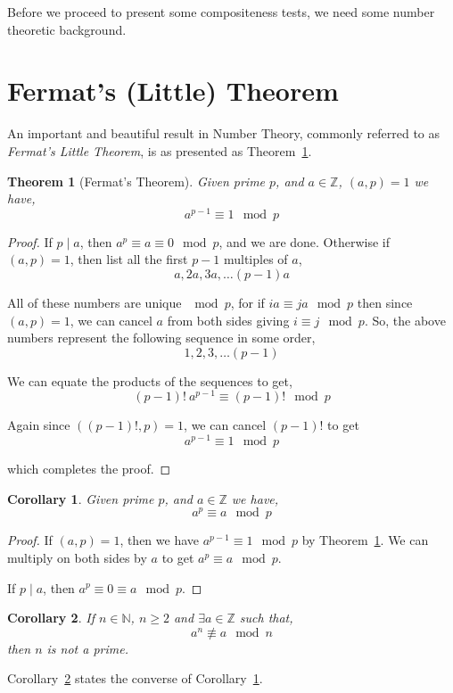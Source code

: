 \documentclass[11pt]{article}
\newtheorem{theorem}{Theorem}[section]
\newtheorem{corollary}{Corollary}[theorem]
\begin{document}
Before we proceed to present some compositeness tests, we need some number theoretic background.

\section{Fermat's (Little) Theorem}

An important and beautiful result in Number Theory, commonly referred to as \emph{Fermat's Little Theorem}, is as presented as Theorem~\ref{theorem:FermatLittleTheorem}.

\begin{theorem}[Fermat's Theorem]
\label{theorem:FermatLittleTheorem}
Given prime $p$, and $a \in \mathbb{Z}$, $(a,p) = 1$ we have,
\[ a^{p-1} \equiv 1 \mod p \]
\end{theorem}

\begin{proof}
If $p \mid a$, then $a^p \equiv a \equiv 0 \mod p$, and we are done. Otherwise if $(a,p) = 1$, then list all the first $p-1$ multiples of $a$,
\[ a, 2a, 3a, \dots (p-1)a\]

All of these numbers are unique $\mod p$, for if $ia \equiv ja \mod p$ then since $(a,p) = 1$, we can cancel $a$ from both sides giving $i \equiv j \mod p$. So, the above numbers represent the following sequence in some order,
\[ 1, 2, 3, \dots (p-1)\]

We can equate the products of the sequences to get, 
\[(p-1)!\ a^{p -1}\equiv (p-1)! \mod p\]

Again since $((p-1)!,p) = 1$, we can cancel $(p-1)!$ to get
\[a^{p-1} \equiv 1 \mod p\]

which completes the proof.
\end{proof}

\begin{corollary}
\label{corollary:BetterFermatLittleTheorem}
Given prime $p$, and $a \in \mathbb{Z}$ we have,
\[ a^p \equiv a \mod p \]
\end{corollary}
 
\begin{proof}
If $(a,p) = 1$, then we have $a^{p-1} \equiv 1 \mod p$ by Theorem~\ref{theorem:FermatLittleTheorem}. We can multiply on both sides by $a$ to get $a^p \equiv a \mod p$.

If $p \mid a$, then $a^p \equiv 0 \equiv a \mod p$. 
\end{proof}

\begin{corollary}
\label{corollary:FermatLittleTheoremConverse}
If $n \in \mathbb{N}$, $n \geq 2$ and $\exists a \in \mathbb{Z}$ such that,
\[a^n \not\equiv a \mod n\]
then $n$ is not a prime.  
\end{corollary}
Corollary~\ref{corollary:FermatLittleTheoremConverse} states the converse of Corollary~\ref{corollary:BetterFermatLittleTheorem}.
\end{document}
